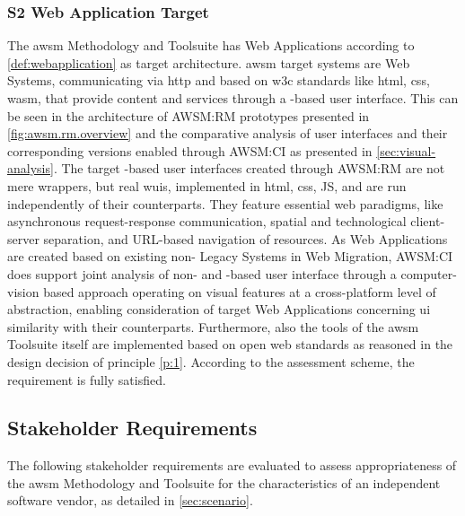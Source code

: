 \subsubsection*{S2 Web Application Target}
The \gls{awsm} Methodology and Toolsuite has \glspl{Web Application} according to \cref{def:webapplication} as target architecture.
\gls{awsm} \glspl{target system} are \glspl{Web System}, communicating via \gls{http} and based on \gls{w3c} standards like \gls{html}, \gls{css}, \gls{wasm}, that provide content and services through a -based user interface.
This can be seen in the architecture of AWSM:RM prototypes presented in \cref{fig:awsm.rm.overview} and the comparative analysis of \web user interfaces and their corresponding \legacy versions enabled through AWSM:CI as presented in \cref{sec:visual-analysis}.
The target -based user interfaces created through AWSM:RM are not mere wrappers, but real \glspl{wui}, implemented in \gls{html}, \gls{css}, JS, and are run independently of their  counterparts.
They feature essential \gls{web} paradigms, like asynchronous request-response communication, spatial and technological client-server separation, and URL-based navigation of resources.
As \glspl{Web Application} are created based on existing non- \glspl{Legacy System} in \gls{Web Migration}, AWSM:CI does support joint analysis of non- and -based user interface through a computer-vision based approach operating on visual features at a cross-platform level of abstraction, enabling consideration of target \glspl{Web Application} concerning \gls{ui} similarity with their  counterparts.
Furthermore, also the tools of the \gls{awsm} Toolsuite itself are implemented based on open \gls{web} standards as reasoned in the design decision of principle \cref{p:1}.
According to the assessment scheme, the requirement is fully satisfied.

\vspace{-15pt}
\hypertarget{sec:evaluation.stakeholder-requirements}{%
\subsection{Stakeholder Requirements}\label{sec:evaluation.stakeholder-requirements}}
\vspace{5pt}

The following stakeholder requirements are evaluated to assess appropriateness of the \gls{awsm} Methodology and Toolsuite for the characteristics of an independent software vendor, as detailed in \cref{sec:scenario}.

